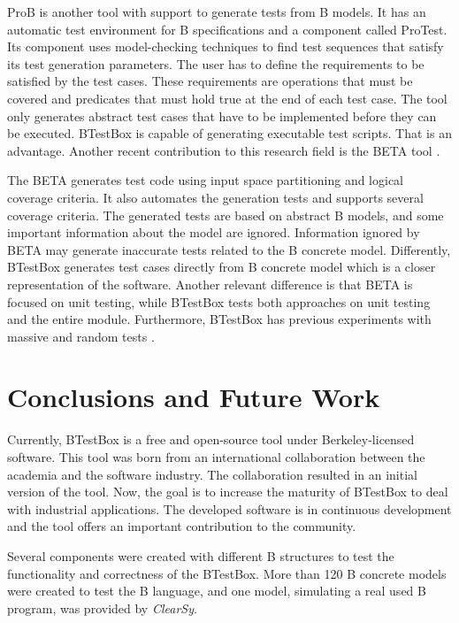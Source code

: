 \documentclass[runningheads]{llncs}
\begin{document}
ProB is another tool with support to generate tests from B models. It has an automatic test environment for B specifications and a component called ProTest.
Its component uses model-checking techniques to find test sequences that satisfy its test generation parameters. The user has to define the requirements to be satisfied by the test cases. These requirements are operations that must be covered and predicates that must hold true at the end of each test case. The tool only generates abstract test cases that have to be implemented before they can be executed. BTestBox is capable of generating executable test scripts. That is an advantage. Another recent contribution to this research field is the BETA tool \cite{ernesto_thesis:2016}. 

The BETA generates test code using input space partitioning and logical coverage criteria. It also automates the generation tests and supports several coverage criteria. The generated tests are based on abstract B models, and some important information about the model are ignored.
Information ignored by BETA may generate inaccurate tests related to the B concrete model. Differently, BTestBox generates test cases directly from B concrete model which is a closer representation of the software.
Another relevant difference is that BETA is focused on unit testing, while BTestBox tests both approaches on unit testing and the entire module. Furthermore, BTestBox has previous experiments with massive and random tests \cite{deharbebtestbox}.

\section{Conclusions and Future Work} \label{sec:Conclusion}


Currently, BTestBox is a free and open-source tool under Berkeley-licensed software.
This tool was born from an international collaboration between the academia and the software industry. The collaboration resulted in an initial version of the tool. Now, the goal is to increase the maturity of BTestBox to deal with industrial applications.
The developed software is in continuous development and the tool offers an important contribution to the community.

Several components were created with different B structures to test the functionality and correctness of the BTestBox. More than 120 B concrete models were created to test the B language, and one model, simulating a real used B program, was provided by \textit{ClearSy}.
\end{document}
